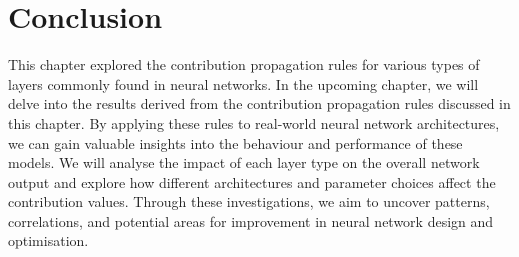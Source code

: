 


\section{Conclusion}

This chapter explored the contribution propagation rules for various types of layers commonly found in neural networks. In the upcoming chapter, we will delve into the results derived from the contribution propagation rules discussed in this chapter. By applying these rules to real-world neural network architectures, we can gain valuable insights into the behaviour and performance of these models. We will analyse the impact of each layer type on the overall network output and explore how different architectures and parameter choices affect the contribution values. Through these investigations, we aim to uncover patterns, correlations, and potential areas for improvement in neural network design and optimisation.